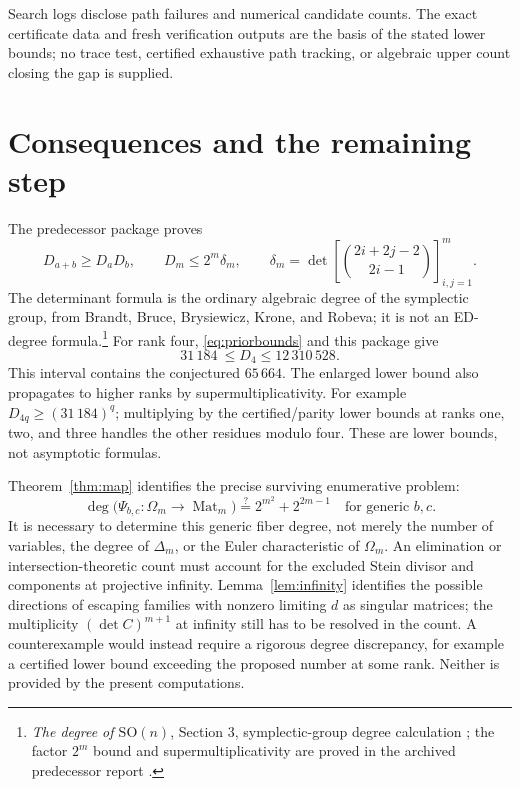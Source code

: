 \documentclass[11pt]{article}
\theoremstyle{remark}\newtheorem{remark}[theorem]{Remark}
\DeclareMathOperator{\Mat}{Mat}
\newcommand{\rankfourbound}{31\,184}
\begin{document}
Search logs disclose path failures and numerical candidate counts. The exact certificate data and fresh verification outputs are the basis of the stated lower bounds; no trace test, certified exhaustive path tracking, or algebraic upper count closing the gap is supplied.

\section{Consequences and the remaining step}\label{sec:gap}
The predecessor package proves
\begin{equation}\label{eq:priorbounds}
D_{a+b}\ge D_aD_b,\qquad
D_m\le 2^m\delta_m,\qquad
\delta_m=\det\!\left[\binom{2i+2j-2}{2i-1}\right]_{i,j=1}^m.
\end{equation}
The determinant formula is the ordinary algebraic degree of the symplectic group, from Brandt, Bruce, Brysiewicz, Krone, and Robeva; it is not an ED-degree formula.\footnote{\emph{The degree of $\mathrm{SO}(n)$}, Section 3, symplectic-group degree calculation \cite{degree}; the factor $2^m$ bound and supermultiplicativity are proved in the archived predecessor report \cite{prior}.}
For rank four, \eqref{eq:priorbounds} and this package give
\begin{equation}\label{eq:rank4interval}
\boxed{\rankfourbound\ \le D_4\le12\,310\,528.}
\end{equation}
This interval contains the conjectured $65\,664$. The enlarged lower bound also propagates to higher ranks by supermultiplicativity. For example $D_{4q}\ge(\rankfourbound)^q$; multiplying by the certified/parity lower bounds at ranks one, two, and three handles the other residues modulo four. These are lower bounds, not asymptotic formulas.

Theorem~\ref{thm:map} identifies the precise surviving enumerative problem:
\[
\deg\bigl(\Psi_{b,c}:\Omega_m\longrightarrow\Mat_m\bigr)
\stackrel{?}{=}2^{m^2}+2^{2m-1}
\quad\text{for generic }b,c.
\]
It is necessary to determine this generic fiber degree, not merely the number of variables, the degree of $\Delta_m$, or the Euler characteristic of $\Omega_m$. An elimination or intersection-theoretic count must account for the excluded Stein divisor and components at projective infinity. Lemma~\ref{lem:infinity} identifies the possible directions of escaping families with nonzero limiting $d$ as singular matrices; the multiplicity $(\det C)^{m+1}$ at infinity still has to be resolved in the count. A counterexample would instead require a rigorous degree discrepancy, for example a certified lower bound exceeding the proposed number at some rank. Neither is provided by the present computations.
\end{document}
